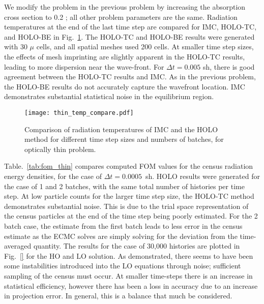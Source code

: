 We modify the problem in the previous problem by increasing the absorption cross section to 0.2
\invcm; all other problem parameters are the same.  Radiation temperatures at the end of
the last time step are compared for IMC, HOLO-TC, and HOLO-BE in
Fig.~\ref{fig:thin_temp_compare}.  The HOLO-TC and HOLO-BE results were generated with 30
$\mu$ cells, and all spatial meshes used 200 cells.  At smaller time step sizes, the
effects of mesh imprinting are slightly apparent in the HOLO-TC results, leading to more
dispersion near the wave-front.  For $\Delta t=0.005$ sh, there is good agreement between
the HOLO-TC results and IMC.  As in the previous problem, the HOLO-BE results do not accurately capture
the wavefront location. IMC demonstrates substantial statistical noise in the equilibrium region.

\begin{figure}[H]
  \centering
    \texttt{[image: thin\_temp\_compare.pdf]}
    \caption{\label{fig:thin_temp_compare} Comparison of radiation temperatures of IMC and
    the HOLO method for different time step sizes and numbers of batches, for optically
thin problem. }
\end{figure}

Table.~\ref{tab:fom_thin} compares computed FOM values for the census
radiation energy densities, for the case of $\Delta t =
0.0005$~sh.  HOLO results were generated for the case of 1 and 2 batches, with the same
total number of histories per time step.  At low particle counts for the larger time step
size, the HOLO-TC method
demonstrates substantial noise.  This is due to the trial space representation of the
census particles at the end of the time step being poorly estimated.  For the 2 batch
case, the estimate from the first batch leads to less error in the census estimate as the
ECMC solves are simply solving for the deviation from the time-averaged quantity.  The
results for the case of 30,000 histories are plotted in Fig.~\ref{} for the HO and LO
solution.  As demonstrated, there seems to have been some instabilities introduced into
the LO equations through noise; sufficient sampling of the census must occur.
At smaller time-steps there is an increase in statistical efficiency, however there has
been a loss in accuracy due to an increase in projection error.  In general, this is a
balance that much be considered.

